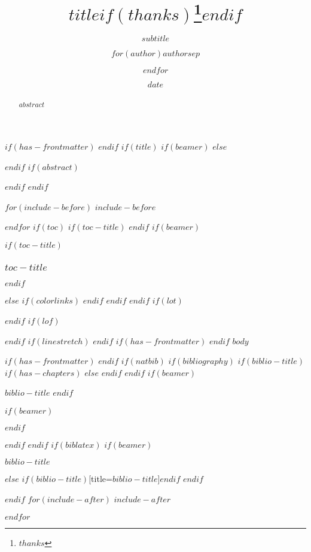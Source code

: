 \documentclass[
$if(fontsize)$
  $fontsize$,
$endif$
$if(lang)$
  $babel-lang$,
$endif$
$if(papersize)$
  $papersize$paper,
$endif$
$for(classoption)$
  $classoption$$sep$,
$endfor$
]{article}
\title{$title$$if(thanks)$\thanks{$thanks$}$endif$}
\subtitle{$subtitle$}
\author{$for(author)$$author$$sep$ \and $endfor$}
\date{$date$}
\begin{document}
$if(has-frontmatter)$
\frontmatter
$endif$
$if(title)$
$if(beamer)$
\frame{\titlepage}
$else$
\maketitle
$endif$
$if(abstract)$
\begin{abstract}
$abstract$
\end{abstract}
$endif$
$endif$

$for(include-before)$
$include-before$

$endfor$
$if(toc)$
$if(toc-title)$
\renewcommand*\contentsname{$toc-title$}
$endif$
$if(beamer)$
\begin{frame}[allowframebreaks]
$if(toc-title)$
  \frametitle{$toc-title$}
$endif$
  \tableofcontents[hideallsubsections]
\end{frame}
$else$
{
$if(colorlinks)$
\hypersetup{linkcolor=$if(toccolor)$$toccolor$$else$$endif$}
$endif$
\setcounter{tocdepth}{$toc-depth$}
\tableofcontents
}
$endif$
$endif$
$if(lot)$
\listoftables
$endif$
$if(lof)$
\listoffigures
$endif$
$if(linestretch)$
$endif$
$if(has-frontmatter)$
\mainmatter
$endif$
$body$

$if(has-frontmatter)$
\backmatter
$endif$
$if(natbib)$
$if(bibliography)$
$if(biblio-title)$
$if(has-chapters)$
\renewcommand\bibname{$biblio-title$}
$else$
\renewcommand\refname{$biblio-title$}
$endif$
$endif$
$if(beamer)$
\begin{frame}[allowframebreaks]{$biblio-title$}
  \bibliographytrue
$endif$
  
$if(beamer)$
\end{frame}
$endif$

$endif$
$endif$
$if(biblatex)$
$if(beamer)$
\begin{frame}[allowframebreaks]{$biblio-title$}
  \bibliographytrue
  \printbibliography[heading=none]
\end{frame}
$else$
\printbibliography$if(biblio-title)$[title=$biblio-title$]$endif$
$endif$

$endif$
$for(include-after)$
$include-after$

$endfor$
\end{document}
